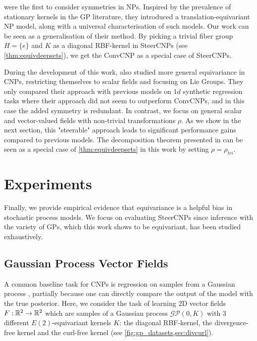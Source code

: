 \textcite{ConvCNP} were the first to consider symmetries in NPs.
Inspired by the prevalence of stationary kernels in the GP literature, they introduced a translation-equivariant NP model, along with a universal characterisation of such models.
Our work can be seen as a generalisation of their method.
By picking a trivial fiber group $H=\{e\}$ and $K$ as a diagonal RBF-kernel in SteerCNPs (see \cref{thm:equivdeepsets}), we get the ConvCNP as a special case of SteerCNPs.

During the development of this work, \textcite{EquivCNPs} also studied more general equivariance in CNPs, restricting themselves to scalar fields and focusing on Lie Groups.
They only compared their approach with previous models on $1d$ synthetic regression tasks where their approach did not seem to outperform ConvCNPs, and in this case the added symmetry is redundant.
In contrast, we focus on general scalar and vector-valued fields with non-trivial transformations $\rho$.
As we show in the next section, this "steerable" approach leads to significant performance gains compared to previous models.
The decomposition theorem presented in \textcite{EquivCNPs} can be seen as a special case of \cref{thm:equivdeepsets} in this work by setting $\rho = \rho_{tri}$.

\section{Experiments}

\label{sec:experiments-steercnp}
Finally, we provide empirical evidence that equivariance is a helpful bias in stochastic process models.
We focus on evaluating SteerCNPs since inference with the variety of GPs, which this work shows to be equivariant, has been studied exhaustively.

\subsection{Gaussian Process Vector Fields}

A common baseline task for CNPs is regression on samples from a Gaussian process \parencite{CNPs,ConvCNP}, partially because one can directly compare the output of the model with the true posterior.
Here, we consider the task of learning $2$D vector fields $F:\mathbb{R}^2\to\mathbb{R}^2$ which are samples of a Gaussian process $\mathcal{GP}(0,K)$ with 3 different $E(2)$-equivariant kernels $K$: the diagonal RBF-kernel, the divergence-free kernel and the curl-free kernel (see \cref{fig:gp_datasets,sec:divcurl}).

